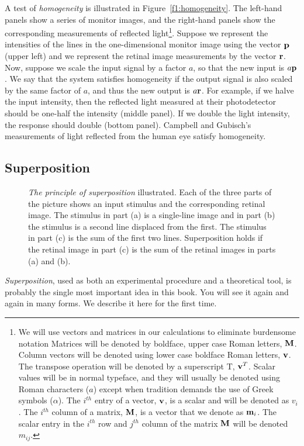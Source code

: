 A test of {\em homogeneity}
is illustrated in Figure~\ref{f1:homogeneity}.
The left-hand panels show a series of monitor images,
and the right-hand panels show the corresponding measurements
of reflected light\footnote{
We will use vectors and matrices in our
calculations to eliminate burdensome notation
Matrices will be denoted by boldface, upper case Roman letters, $\bf M$.
Column vectors will be denoted using lower case boldface Roman letters,
${\bf v}$.
The transpose operation will be denoted by a superscript T, ${\bf v}^T$.
Scalar values will be in normal typeface, and they will
usually be denoted using Roman characters ($a$) except when
tradition demands the  use of Greek symbols ($\alpha$).
The $i^{th}$ entry of a vector, ${\bf v}$, is a scalar and will
be denoted as $v_i$.
The $i^{th}$ column of a matrix, $\bf M$, is a vector
that we denote as ${\bf m}_i$.
The scalar entry in the $i^{th}$ row and
$j^{th}$ column of the matrix ${\bf M}$ will be denoted $m_{ij}$.
}.
Suppose we represent the intensities of the
lines in the one-dimensional monitor image
using the vector $\mbox {$\bf p$}$ (upper left)
and we represent the retinal image measurements
by the vector $\mbox {$\bf r$}$.
Now, suppose we scale the input signal by a factor $a$,
so that the new input is $a \mbox {$\bf p$}$.
We say that the system satisfies homogeneity
if the output signal is also scaled by the same factor of $a$,
and thus the new output is $a \mbox {$\bf r$}$.
For example, if we halve the input intensity,
then the reflected light measured at their photodetector
should be one-half the intensity (middle panel).
If we double the light intensity, the response should double (bottom panel).
Campbell and Gubisch's measurements
of light reflected from the human eye satisfy homogeneity.

\subsection*{Superposition}

\begin{figure}
\centerline {
}
\caption[Superposition]{
{\em The principle of superposition} illustrated.
Each of the three parts of the picture shows an
input stimulus and the corresponding retinal image.
The stimulus in part (a) is a single-line
image and in part (b) the stimulus is a second line displaced from
the first.
The stimulus in part (c) is the sum of the first two lines.
Superposition holds if the retinal image in part (c) is
the sum of the retinal images in parts (a) and (b).
}
\label{f1:superposition}
\end{figure}
{\em Superposition}, used as both an experimental
procedure and a theoretical tool,
is probably the single most important idea in this book.
You will see it again and again in many forms.
We describe it here for the first time.

